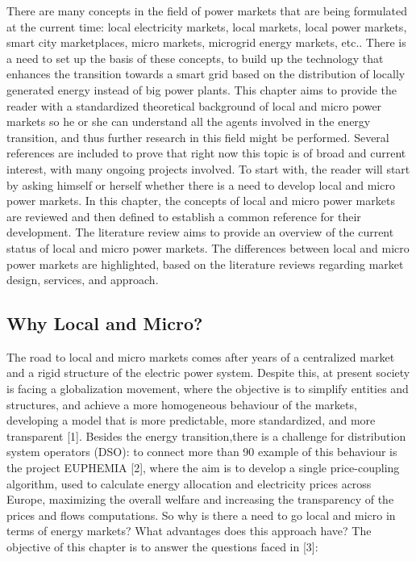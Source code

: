 There are many concepts in the field of power markets that are being formulated at the current time: local electricity markets, local markets, local power markets, smart city marketplaces, micro markets, microgrid energy markets, etc.. There is a need to set up the basis of these concepts, to build up the technology that enhances the transition towards a smart grid based on the distribution of locally generated energy instead of big power plants.
This chapter aims to provide the reader with a standardized theoretical background of local and micro power markets so he or she can understand all the agents involved in the energy transition, and thus further research in this field might be performed. Several references are included to prove that right now this topic is of broad and current interest, with many ongoing projects involved.
To start with, the reader will start by asking himself or herself whether there is a need to develop local and micro power markets.
In this chapter, the concepts of local and micro power markets are reviewed and then defined to establish a common reference for their development. The literature review aims to provide an overview of the current status of local and micro power markets. The differences between local and micro power markets are highlighted, based on the literature reviews regarding market design, services, and approach.

\subsection{Why Local and Micro?}
The road to local and micro markets comes after years of a centralized market and a rigid structure of the electric power system. Despite this, at present society is facing a globalization movement, where the objective is to simplify entities and structures, and achieve a more homogeneous behaviour of the markets, developing a model that is more predictable, more standardized, and more transparent [1]. Besides the energy transition,there is a challenge for distribution system operators (DSO): to connect more than 90%
example of this behaviour is the project EUPHEMIA [2], where the aim is to develop a single price-coupling algorithm, used to calculate energy allocation and electricity prices across Europe, maximizing the overall welfare and increasing the transparency of the prices and flows computations. So why is there a need to go local and micro in terms of energy markets? What advantages does this approach have? The objective of this chapter is to answer the questions faced in [3]:

